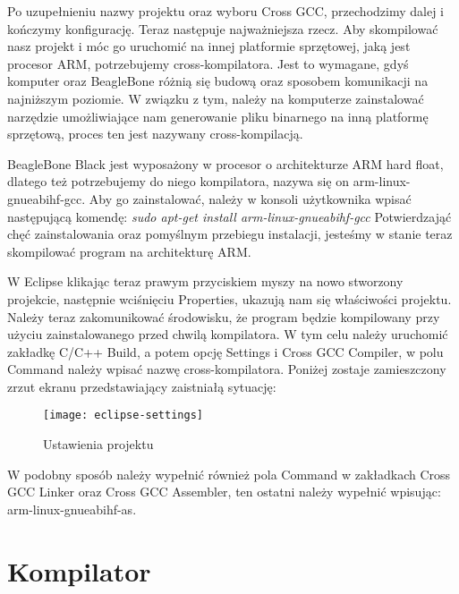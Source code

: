 Po uzupełnieniu nazwy projektu oraz wyboru Cross GCC, przechodzimy dalej i kończymy konfigurację. Teraz następuje najważniejsza rzecz. Aby skompilować nasz projekt i móc go uruchomić na innej platformie sprzętowej, jaką jest procesor ARM, potrzebujemy cross-kompilatora. Jest to wymagane, gdyś komputer oraz BeagleBone różnią się budową oraz sposobem komunikacji na najniższym poziomie. W związku z tym, należy na komputerze zainstalować narzędzie umożliwiające nam generowanie pliku binarnego na inną platformę sprzętową, proces ten jest nazywany cross-kompilacją.

BeagleBone Black jest wyposażony w procesor o architekturze ARM hard float, dlatego też potrzebujemy do niego kompilatora, nazywa się on arm-linux-gnueabihf-gcc. Aby go zainstalować, należy w konsoli użytkownika wpisać następującą komendę:\newline
\emph{sudo apt-get install arm-linux-gnueabihf-gcc}\newline
Potwierdzająć chęć zainstalowania oraz pomyślnym przebiegu instalacji, jesteśmy w stanie teraz skompilować program na architekturę ARM.

W Eclipse klikając teraz prawym przyciskiem myszy na nowo stworzony projekcie, następnie wciśnięciu Properties, ukazują nam się właściwości projektu. Należy teraz zakomunikować środowisku, że program będzie kompilowany przy użyciu zainstalowanego przed chwilą kompilatora. W tym celu należy uruchomić zakładkę C/C++ Build, a potem opcję Settings i Cross GCC Compiler, w polu Command należy wpisać nazwę cross-kompilatora. Poniżej zostaje zamieszczony zrzut ekranu przedstawiający zaistniałą sytuację:

\begin{figure}[h]
\centering
\texttt{[image: eclipse-settings]}
\caption{Ustawienia projektu}
\label{fig:eclipse-settings}
\end{figure}

W podobny sposób należy wypełnić również pola Command w zakładkach Cross GCC Linker oraz Cross GCC Assembler, ten ostatni należy wypełnić wpisując: arm-linux-gnueabihf-as.

\section{Kompilator}